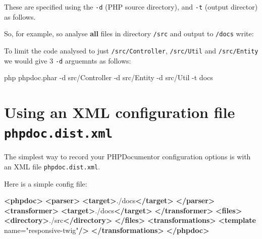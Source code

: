 \documentclass[a4paperpaper,openright]{book}
\newenvironment{Shaded}{}{}
\newcommand{\ExtensionTok}[1]{#1}
\newcommand{\KeywordTok}[1]{\textcolor[rgb]{0.00,0.44,0.13}{\textbf{#1}}}
\newcommand{\NormalTok}[1]{#1}
\newcommand{\OtherTok}[1]{\textcolor[rgb]{0.00,0.44,0.13}{#1}}
\newcommand{\StringTok}[1]{\textcolor[rgb]{0.25,0.44,0.63}{#1}}
\begin{document}
These are specified using the \texttt{-d} (PHP source directory), and
\texttt{-t} (output director) as follows.

So, for example, so analyse \textbf{all} files in directory
\texttt{/src} and output to \texttt{/docs} write:

\begin{Shaded}
\end{Shaded}

To limit the code analysed to just \texttt{/src/Controller},
\texttt{/src/Util} and \texttt{/src/Entity} we would give 3 \texttt{-d}
arguemnts as follows:

\begin{Shaded}
\begin{Highlighting}[]
    \ExtensionTok{php}\NormalTok{ phpdoc.phar -d src/Controller -d src/Entity -d src/Util -t docs}
\end{Highlighting}
\end{Shaded}

\hypertarget{using-an-xml-configuration-file-phpdoc.dist.xml}{%
\section{\texorpdfstring{Using an XML configuration file
\texttt{phpdoc.dist.xml}}{Using an XML configuration file phpdoc.dist.xml}}\label{using-an-xml-configuration-file-phpdoc.dist.xml}}

The simplest way to record your PHPDocumentor configuration options is
with an XML file \texttt{phpdoc.dist.xml}.

Here is a simple config file:

\begin{Shaded}
\begin{Highlighting}[]
    \KeywordTok{<phpdoc>}
        \KeywordTok{<parser>}
            \KeywordTok{<target>}\NormalTok{./docs}\KeywordTok{</target>}
        \KeywordTok{</parser>}
        \KeywordTok{<transformer>}
            \KeywordTok{<target>}\NormalTok{./docs}\KeywordTok{</target>}
        \KeywordTok{</transformer>}
        \KeywordTok{<files>}
            \KeywordTok{<directory>}\NormalTok{./src}\KeywordTok{</directory>}
        \KeywordTok{</files>}
        \KeywordTok{<transformations>}
            \KeywordTok{<template}\OtherTok{ name=}\StringTok{"responsive-twig"}\KeywordTok{/>}
        \KeywordTok{</transformations>}
    \KeywordTok{</phpdoc>}
\end{Highlighting}
\end{Shaded}
\end{document}
